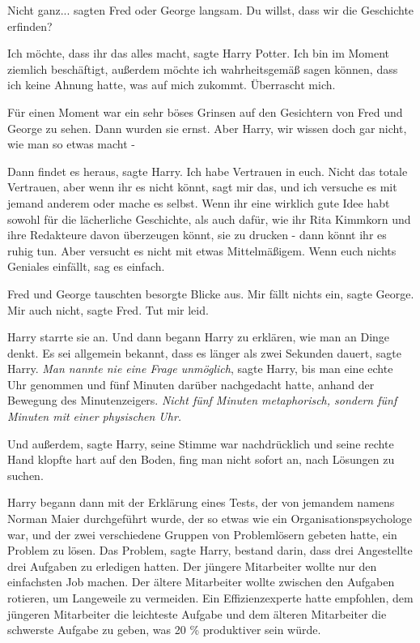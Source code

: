 \glqq Nicht ganz...\grqq{} sagten Fred oder George langsam. \glqq Du willst,
dass wir die Geschichte erfinden?\grqq{}

\glqq Ich möchte, dass ihr das alles macht\grqq{}, sagte Harry Potter. \glqq Ich
bin im Moment ziemlich beschäftigt, außerdem möchte ich wahrheitsgemäß sagen
können, dass ich keine Ahnung hatte, was auf mich zukommt. Überrascht
mich.\grqq{}

Für einen Moment war ein sehr böses Grinsen auf den Gesichtern von Fred und
George zu sehen. Dann wurden sie ernst. \glqq Aber Harry, wir wissen doch gar
nicht, wie man so etwas macht -\grqq{}

\glqq Dann findet es heraus\grqq{}, sagte Harry. \glqq Ich habe Vertrauen in
euch. Nicht das totale Vertrauen, aber wenn ihr es nicht könnt, sagt mir das,
und ich versuche es mit jemand anderem oder mache es selbst. Wenn ihr eine
wirklich gute Idee habt sowohl für die lächerliche Geschichte, als auch dafür,
wie ihr Rita Kimmkorn und ihre Redakteure davon überzeugen könnt, sie zu drucken
- dann könnt ihr es ruhig tun. Aber versucht es nicht mit etwas Mittelmäßigem.
Wenn euch nichts Geniales einfällt, sag es einfach.\grqq{}

Fred und George tauschten besorgte Blicke aus. \glqq Mir fällt nichts
ein\grqq{}, sagte George. \glqq Mir auch nicht\grqq{}, sagte Fred. \glqq Tut mir
leid.\grqq{}

Harry starrte sie an. Und dann begann Harry zu erklären, wie man an Dinge denkt.
Es sei allgemein bekannt, dass es länger als zwei Sekunden dauert, sagte Harry.
\emph{ Man nannte nie eine Frage unmöglich}, sagte Harry, bis man eine echte Uhr
genommen und fünf Minuten darüber nachgedacht hatte, anhand der Bewegung des
Minutenzeigers.
\emph{Nicht fünf Minuten metaphorisch, sondern fünf Minuten mit einer physischen Uhr.}

Und außerdem, sagte Harry, seine Stimme war nachdrücklich und seine rechte Hand
klopfte hart auf den Boden, fing man nicht sofort an, nach Lösungen zu suchen.

Harry begann dann mit der Erklärung eines Tests, der von jemandem namens Norman
Maier durchgeführt wurde, der so etwas wie ein Organisationspsychologe war, und
der zwei verschiedene Gruppen von Problemlösern gebeten hatte, ein Problem zu
lösen. Das Problem, sagte Harry, bestand darin, dass drei Angestellte drei
Aufgaben zu erledigen hatten. Der jüngere Mitarbeiter wollte nur den einfachsten
Job machen. Der ältere Mitarbeiter wollte zwischen den Aufgaben rotieren, um
Langeweile zu vermeiden. Ein Effizienzexperte hatte empfohlen, dem jüngeren
Mitarbeiter die leichteste Aufgabe und dem älteren Mitarbeiter die schwerste
Aufgabe zu geben, was 20 \% produktiver sein würde.

